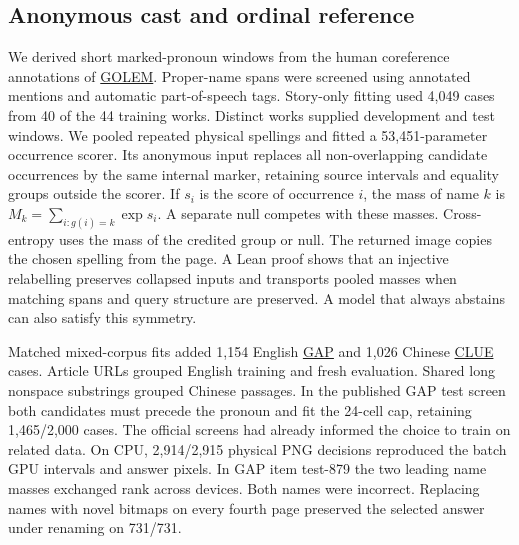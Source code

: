 \subsection*{Anonymous cast and ordinal reference}
We derived short marked-pronoun windows from the human coreference annotations of \href{https://aclanthology.org/2026.acl-short.39/}{GOLEM}. Proper-name spans were screened using annotated mentions and automatic part-of-speech tags. Story-only fitting used 4,049 cases from 40 of the 44 training works. Distinct works supplied development and test windows. We pooled repeated physical spellings and fitted a 53,451-parameter occurrence scorer. Its anonymous input replaces all non-overlapping candidate occurrences by the same internal marker, retaining source intervals and equality groups outside the scorer. If $s_i$ is the score of occurrence $i$, the mass of name $k$ is $M_k=\sum_{i:g(i)=k}\exp s_i$. A separate null competes with these masses. Cross-entropy uses the mass of the credited group or null. The returned image copies the chosen spelling from the page. A Lean proof shows that an injective relabelling preserves collapsed inputs and transports pooled masses when matching spans and query structure are preserved. A model that always abstains can also satisfy this symmetry.

Matched mixed-corpus fits added 1,154 English \href{https://github.com/google-research-datasets/gap-coreference}{GAP} and 1,026 Chinese \href{https://github.com/CLUEbenchmark/CLUE}{CLUE} cases. Article URLs grouped English training and fresh evaluation. Shared long nonspace substrings grouped Chinese passages. In the published GAP test screen both candidates must precede the pronoun and fit the 24-cell cap, retaining 1,465/2,000 cases. The official screens had already informed the choice to train on related data. On CPU, 2,914/2,915 physical PNG decisions reproduced the batch GPU intervals and answer pixels. In GAP item test-879 the two leading name masses exchanged rank across devices. Both names were incorrect. Replacing names with novel bitmaps on every fourth page preserved the selected answer under renaming on 731/731.

